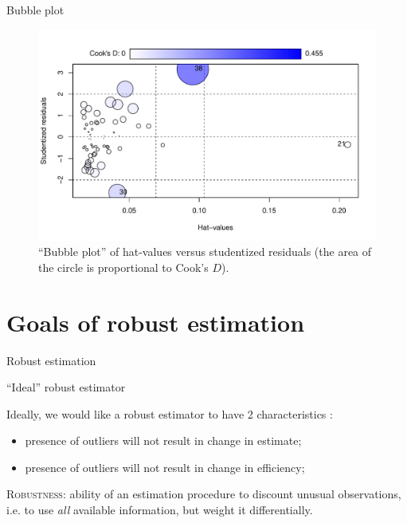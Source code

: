 \documentclass[12pt,english,pdf,xcolor=dvipsnames,aspectratio=169,handout]{beamer}\usepackage[]{graphicx}\usepackage[]{xcolor}
\begin{document}
\begin{frame}{Bubble plot}



\begin{figure}
\centering
\includegraphics[scale=0.5]{../04-graphs/05-04.pdf}
\caption{\label{fig:fig-02} ``Bubble plot'' of hat-values versus studentized residuals (the area of the circle is proportional to Cook's $D$).}
\end{figure}

\end{frame}




\section{Goals of robust estimation}


\begin{frame}
\begin{center}
    \Huge Robust estimation
\end{center}
\end{frame}


\begin{frame}{``Ideal'' robust estimator}

Ideally, we would like a robust estimator to have 2 characteristics \cite{mosteller1977}:

\begin{itemize}
\item presence of outliers \textcolor{title}{will not result} in change in estimate;
\item presence of outliers \textcolor{title}{will not result} in change in efficiency;
\end{itemize}\bigskip

\textsc{Robustness}: ability of an estimation procedure to discount unusual observations, i.e. to use \textit{all} available information, but weight it differentially.

\end{frame}
\end{document}
